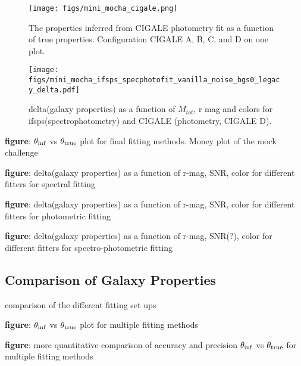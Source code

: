 \begin{figure}
\begin{center}
\texttt{[image: figs/mini\_mocha\_cigale.png]} 
\caption{The properties inferred from CIGALE photometry fit as a function of true properties. Configuration CIGALE A, B, C, and D on one plot.
}
\label{fig:photo_cigaleALL}
\end{center}
\end{figure}

\begin{figure}
\begin{center}
\texttt{[image: figs/mini\_mocha\_ifsps\_specphotofit\_vanilla\_noise\_bgs0\_legacy\_delta.pdf]} 
\caption{delta(galaxy properties) as a function of $M_{tot}$, r mag and colors for ifsps(spectrophotometry) and CIGALE (photometry, CIGALE D). 
}
\label{fig:photo_cigaleALL}
\end{center}
\end{figure}

{\bf figure}: $\theta_{\rm inf}$ vs $\theta_{\rm true}$ plot for final fitting methods. Money plot of the mock challenge 

{\bf figure}: delta(galaxy properties) as a function of r-mag, SNR, color for different fitters for spectral fitting

{\bf figure}: delta(galaxy properties) as a function of r-mag, SNR, color for different fitters for photometric fitting

{\bf figure}: delta(galaxy properties) as a function of r-mag, SNR(?), color for different fitters for spectro-photometric fitting 

\subsection{Comparison of Galaxy Properties}
comparison of the different fitting set ups

{\bf figure}: $\theta_{\rm inf}$ vs $\theta_{\rm true}$ plot for multiple fitting methods 

{\bf figure}: more quantitative comparison of accuracy and precision $\theta_{\rm inf}$ vs $\theta_{\rm true}$ for multiple fitting methods 


